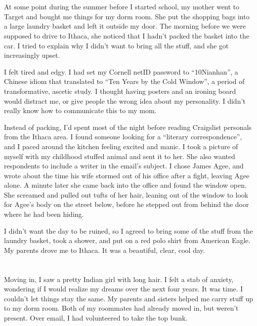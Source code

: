 \section{}
At some point during the summer before I started school, my mother went to
Target and bought me things for my dorm room.  She put the shopping bags into a
large laundry basket and left it outside my door.  The morning before we were
supposed to drive to Ithaca, she noticed that I hadn't packed the basket into
the car.  I tried to explain why I didn't want to bring all the stuff, and she
got increasingly upset.

I felt tired and edgy.  I had set my Cornell netID password to ``10Nianhan'', a
Chinese idiom that translated to ``Ten Years by the Cold Window'', a period of
transformative, ascetic study.  I thought having posters and an ironing board
would distract me, or give people the wrong idea about my personality.  I
didn't really know how to communicate this to my mom.

Instead of packing, I'd spent most of the night before reading Craigslist
personals from the Ithaca area.  I found someone looking for a ``literary
correspondence'', and I paced around the kitchen feeling excited and manic.  I
took a picture of myself with my childhood stuffed animal and sent it to her.
She also wanted respondents to include a writer in the email's subject.  I
chose James Agee, and wrote about the time his wife stormed out of his office
after a fight, leaving Agee alone.  A minute later she came back into the
office and found the window open.  She screamed and pulled out tufts of her
hair, leaning out of the window to look for Agee's body on the street below,
before he stepped out from behind the door where he had been hiding.

I didn't want the day to be ruined, so I agreed to bring some of the stuff from
the laundry basket, took a shower, and put on a red polo shirt from American
Eagle.  My parents drove me to Ithaca.  It was a beautiful, clear, cool day.  

\section{}

Moving in, I saw a pretty Indian girl with long hair.  I felt a stab of
anxiety, wondering if I would realize my dreams over the next four years.  It
was time.  I couldn't let things stay the same.  My parents and sisters helped
me carry stuff up to my dorm room.  Both of my roommates had already moved in,
but weren't present.  Over email, I had volunteered to take the top bunk.

